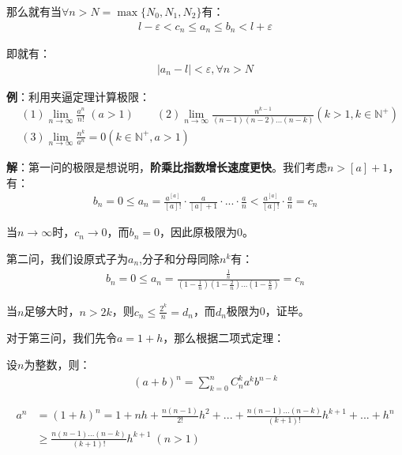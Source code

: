 \documentclass{ctexart}
\let\oldtextbf\textbf %
\renewcommand{\textbf}[1]{\textcolor{btex}{\oldtextbf{#1}}} %
\begin{document}
那么就有当$\forall n>N=\max\{N_0,N_1,N_2\}$有：
\begin{align*}
    l-\varepsilon <c_n\leq a_n\leq b_n<l+\varepsilon
\end{align*}

即就有：
\begin{align*}
    |a_n-l|<\varepsilon ,\forall n>N
\end{align*}

\textbf{\color{btex}例}：利用夹逼定理计算极限：
\begin{align*}
 & (1) \lim_{n\to\infty}\frac{a^n}{n!}\;(a>1) \qquad (2)\lim_{n\to\infty}\frac{n^{k-1}}{(n-1)(n-2)...(n-k)}(k>1,k\in\mathbb{N^+})\\
&(3) \lim_{n\to\infty} \frac{n^k}{a^n}=0 (k\in\mathbb{N^+},a>1)  
\end{align*}

\textbf{\color{btex}解}：第一问的极限是想说明，\textbf{\color{btex}阶乘比指数增长速度更快}。我们考虑$n>[a]+1$，有：
\begin{align*}
  b_n=  0\leq a_n=\frac{a^{[a]}}{[a]!}\cdot\frac{a}{[a]+1}\cdot ...\cdot \frac{a}{n}<\frac{a^{[a]}}{[a]!}\cdot \frac{a}{n}=c_n
\end{align*}

当$n\to\infty$时，$c_n\to 0$，而$b_n=0$，因此原极限为0。

第二问，我们设原式子为$a_n$,分子和分母同除$n^k$有：
\begin{align*}
    b_n=0\leq a_n=\frac{\frac{1}{n}}{(1-\frac{1}{n})(1-\frac{2}{n})...(1-\frac{k}{n})}=c_n
\end{align*}

当$n$足够大时，$n>2k$，则$c_n\leq\frac{2^k}{n}=d_n$，而$d_n$极限为0，证毕。

对于第三问，我们先令$a=1+h$，那么根据二项式定理：
\begin{tcolorbox}[
    colback=bac1,     %
    colframe=fra1,   %
    coltitle=white,             %
    coltext=tex1,
    title=二项式定理,
    fonttitle=\bfseries,        %
arc=3mm,                     %
breakable
]
设$n$为整数，则：
\begin{align*}
    (a+b)^n=\sum_{k=0}^n C_{n}^k a^kb^{n-k}\tag{1-7}
\end{align*}
\end{tcolorbox}
\begin{align*}
a^n&=(1+h)^n=1+nh+\frac{n(n-1)}{2!}h^2+...+\frac{n(n-1)...(n-k)}{(k+1)!} h^{k+1}+...+h^n\\
 &\geq \frac{n(n-1)...(n-k)}{(k+1)!} h^{k+1} \;(n>1) 
\end{align*}
\end{document}
